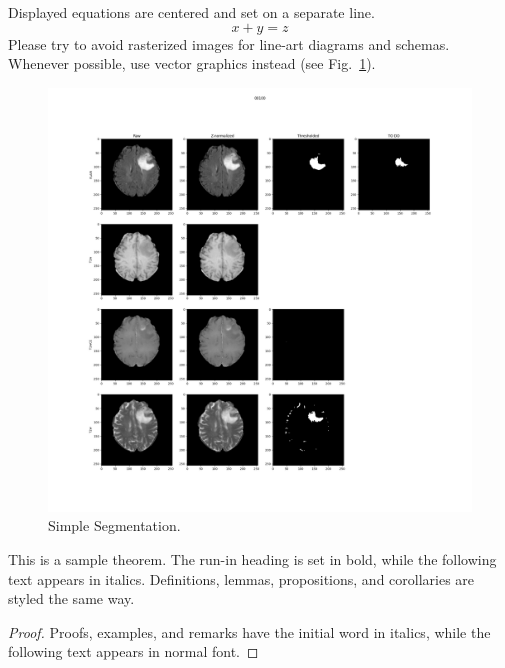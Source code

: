 \documentclass[runningheads]{llncs}
\begin{document}
\noindent Displayed equations are centered and set on a separate
line.
\begin{equation}
x + y = z
\end{equation}
Please try to avoid rasterized images for line-art diagrams and
schemas. Whenever possible, use vector graphics instead (see
Fig.~\ref{fig1}).

\begin{figure}
\includegraphics[width=\textwidth]{00100-19}
\caption{Simple Segmentation.} \label{fig1}
\end{figure}

\begin{theorem}
This is a sample theorem. The run-in heading is set in bold, while
the following text appears in italics. Definitions, lemmas,
propositions, and corollaries are styled the same way.
\end{theorem}
%
%
\begin{proof}
Proofs, examples, and remarks have the initial word in italics,
while the following text appears in normal font.
\end{proof}

%
%
%
% 
% 
%



\end{document}
